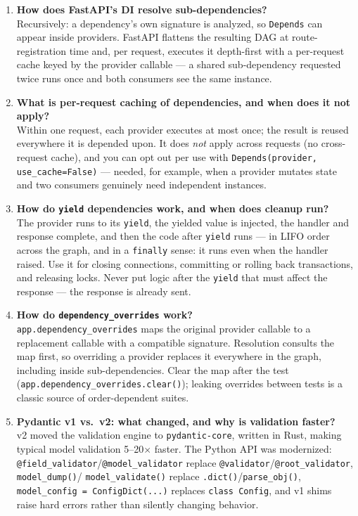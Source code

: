 \begin{enumerate}[label=\textbf{Q\arabic*.}, leftmargin=1.3cm, itemsep=0.8em]
\item \textbf{How does FastAPI's DI resolve sub-dependencies?}\\
Recursively: a dependency's own signature is analyzed, so
\texttt{Depends} can appear inside providers. FastAPI flattens the resulting
DAG at route-registration time and, per request, executes it depth-first
with a per-request cache keyed by the provider callable --- a shared
sub-dependency requested twice runs once and both consumers see the same
instance.

\item \textbf{What is per-request caching of dependencies, and when does it
not apply?}\\
Within one request, each provider executes at most once; the result is
reused everywhere it is depended upon. It does \emph{not} apply across
requests (no cross-request cache), and you can opt out per use with
\texttt{Depends(provider, use\_cache=False)} --- needed, for example, when a
provider mutates state and two consumers genuinely need independent
instances.

\item \textbf{How do \texttt{yield} dependencies work, and when does cleanup
run?}\\
The provider runs to its \texttt{yield}, the yielded value is injected, the
handler and response complete, and then the code after \texttt{yield} runs
--- in LIFO order across the graph, and in a \texttt{finally} sense: it runs
even when the handler raised. Use it for closing connections, committing or
rolling back transactions, and releasing locks. Never put logic after the
\texttt{yield} that must affect the response --- the response is already
sent.

\item \textbf{How do \texttt{dependency\_overrides} work?}\\
\texttt{app.dependency\_overrides} maps the original provider callable to a
replacement callable with a compatible signature. Resolution consults the
map first, so overriding a provider replaces it everywhere in the graph,
including inside sub-dependencies. Clear the map after the test
(\texttt{app.dependency\_overrides.clear()}); leaking overrides between
tests is a classic source of order-dependent suites.

\item \textbf{Pydantic v1 vs.\ v2: what changed, and why is validation
faster?}\\
v2 moved the validation engine to \texttt{pydantic-core}, written in Rust,
making typical model validation 5--20$\times$ faster. The Python API was
modernized: \texttt{@field\_validator}/\texttt{@model\_validator} replace
\texttt{@validator}/\texttt{@root\_validator}, \texttt{model\_dump()}/
\texttt{model\_validate()} replace \texttt{.dict()}/\texttt{parse\_obj()},
\texttt{model\_config = ConfigDict(...)} replaces \texttt{class Config},
and v1 shims raise hard errors rather than silently changing behavior.


\end{enumerate}
